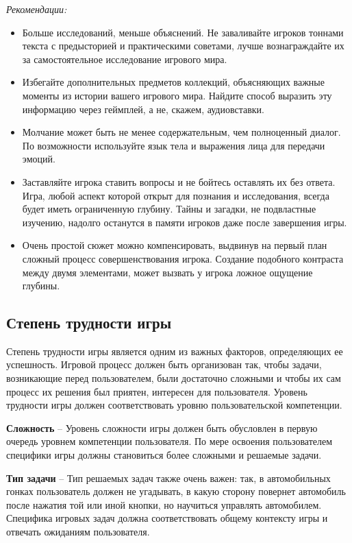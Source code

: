 \documentclass{article}
\begin{document}
\noindent\textit{Рекомендации:}
\begin{itemize}
  \item Больше исследований, меньше объяснений. Не заваливайте игроков тоннами текста с предысторией и практическими советами, лучше вознаграждайте их за самостоятельное исследование игрового мира.
  \item Избегайте дополнительных предметов коллекций, объясняющих важные моменты из истории вашего игрового мира. Найдите способ выразить эту информацию через геймплей, а не, скажем, аудиовставки.
  \item Молчание может быть не менее содержательным, чем полноценный диалог. По возможности используйте язык тела и выражения лица для передачи эмоций.
  \item Заставляйте игрока ставить вопросы и не бойтесь оставлять их без ответа. Игра, любой аспект которой открыт для познания и исследования, всегда будет иметь ограниченную глубину. Тайны и загадки, не подвластные изучению, надолго останутся в памяти игроков даже после завершения игры.
  \item Очень простой сюжет можно компенсировать, выдвинув на первый план сложный процесс совершенствования игрока. Создание подобного контраста между двумя элементами, может вызвать у игрока ложное ощущение глубины.
\end{itemize}

\subsection{Степень трудности игры}
Степень трудности игры является одним из важных факторов, определяющих ее успешность. Игровой процесс должен быть организован так, чтобы задачи, возникающие перед пользователем, были достаточно сложными и чтобы их сам процесс их решения был приятен, интересен для пользователя. Уровень трудности игры должен соответствовать уровню пользовательской компетенции.

\textbf{Сложность} -- Уровень сложности игры должен быть обусловлен в первую очередь уровнем компетенции пользователя. По мере освоения пользователем специфики игры должны становиться более сложными и решаемые задачи.

\textbf{Тип задачи} -- Тип решаемых задач также очень важен: так, в автомобильных гонках пользователь должен не угадывать, в какую сторону повернет автомобиль после нажатия той или иной кнопки, но научиться управлять автомобилем. Специфика игровых задач должна соответствовать общему контексту игры и отвечать ожиданиям пользователя.
\end{document}
